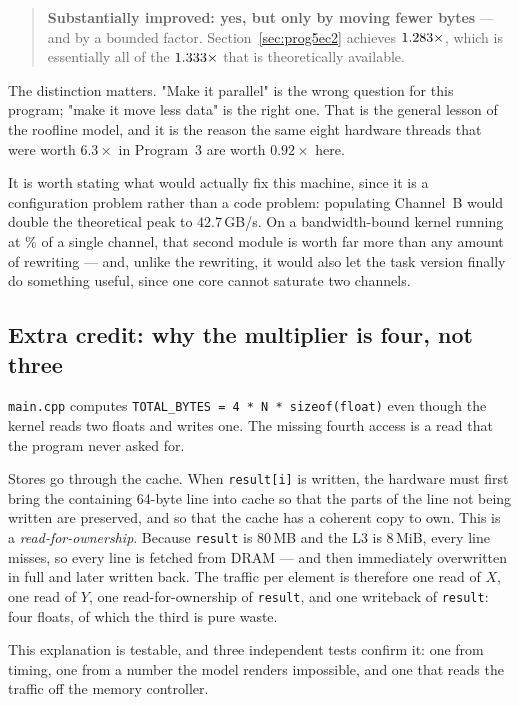 \documentclass[11pt,a4paper]{article}
\begin{document}
\begin{quote}
\textbf{Substantially improved: yes, but only by moving fewer bytes} --- and by
a bounded factor. Section~\ref{sec:prog5ec2} achieves
$1.283\times$, which is essentially all of the
$1.333\times$ that is theoretically available.
\end{quote}

The distinction matters. "Make it parallel" is the wrong question for this
program; "make it move less data" is the right one. That is the general lesson
of the roofline model, and it is the reason the same eight hardware threads
that were worth $6.3\times$ in Program~3 are worth $0.92\times$ here.

It is worth stating what would actually fix this machine, since it is a
configuration problem rather than a code problem: populating Channel~B would
double the theoretical peak to $42.7$\,GB/s. On a bandwidth-bound kernel
running at \prognFiveBestFrac\% of a single channel, that second module is worth far more
than any amount of rewriting --- and, unlike the rewriting, it would also let
the task version finally do something useful, since one core cannot saturate
two channels.

\subsection{Extra credit: why the multiplier is four, not three}
\label{sec:prog5ec1}

\texttt{main.cpp} computes \texttt{TOTAL\_BYTES = 4 * N * sizeof(float)} even
though the kernel reads two floats and writes one. The missing fourth access is
a read that the program never asked for.

Stores go through the cache. When \texttt{result[i]} is written, the hardware
must first bring the containing 64-byte line into cache so that the parts of
the line not being written are preserved, and so that the cache has a coherent
copy to own. This is a \emph{read-for-ownership}. Because \texttt{result} is
80\,MB and the L3 is 8\,MiB, every line misses, so every line is fetched from
DRAM --- and then immediately overwritten in full and later written back. The
traffic per element is therefore one read of $X$, one read of $Y$, one
read-for-ownership of \texttt{result}, and one writeback of \texttt{result}:
four floats, of which the third is pure waste.

This explanation is testable, and three independent tests confirm it: one
from timing, one from a number the model renders impossible, and one that
reads the traffic off the memory controller.
\end{document}
